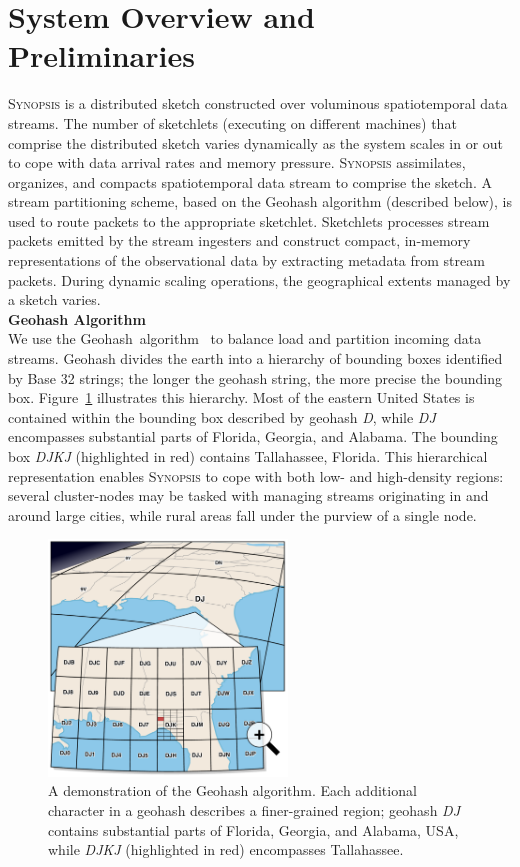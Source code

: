 \section{System Overview and Preliminaries}
\label{sec:system}
\textsc{Synopsis} is a distributed sketch constructed over voluminous spatiotemporal data streams.
The number of sketchlets (executing on different machines) that comprise the distributed sketch varies dynamically as the system scales in or out to cope with data arrival rates and memory pressure.
\textsc{Synopsis} assimilates, organizes, and compacts spatiotemporal data stream to comprise the sketch.
A stream partitioning scheme, based on the Geohash algorithm (described below), is used to route packets to the appropriate sketchlet.
Sketchlets processes stream packets emitted by the stream ingesters and construct compact, in-memory representations of the observational data by extracting metadata from stream packets.
During dynamic scaling operations, the geographical extents managed by a sketch varies.
\vspace{1.5em} \\
\textbf{Geohash Algorithm} \\
We use the Geohash~algorithm~\cite{geohash} to balance load and partition incoming data streams. Geohash divides the earth into a hierarchy of bounding boxes identified by Base 32 strings; the longer the geohash string, the more precise the bounding box. Figure~\ref{fig:geohash} illustrates this hierarchy. Most of the eastern United States is contained within the bounding box described by geohash \emph{D}, while \emph{DJ} encompasses substantial parts of Florida, Georgia, and Alabama. The bounding box \emph{DJKJ} (highlighted in red) contains Tallahassee, Florida. This hierarchical representation enables \textsc{Synopsis} to cope with both low- and high-density regions: several cluster-nodes may be tasked with managing streams originating in and around large cities, while rural areas fall under the purview of a single node.

\begin{figure}[b!]
    \centerline{\includegraphics[width=2.5in]{figures/geohash.pdf}}
    \caption{A demonstration of the Geohash algorithm. Each additional character in a geohash describes a finer-grained region; geohash \emph{DJ} contains substantial parts of Florida, Georgia, and Alabama, USA, while \emph{DJKJ} (highlighted in red) encompasses Tallahassee.}
    \label{fig:geohash}
\end{figure}

